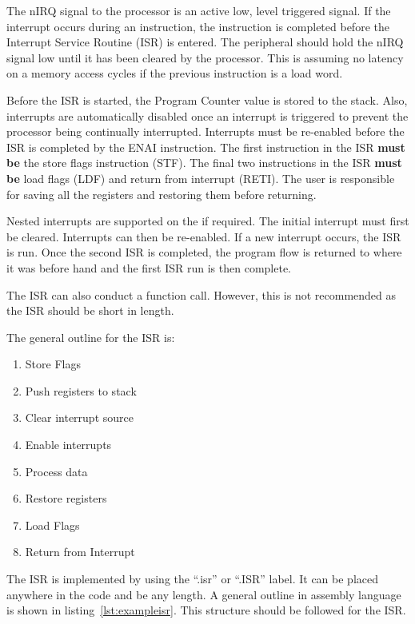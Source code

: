 The nIRQ signal to the \samurai{} processor is an active low, level triggered signal.
If the interrupt occurs during an instruction, the instruction is completed before the Interrupt Service Routine (ISR) is entered.
The peripheral should hold the nIRQ signal low until it has been cleared by the processor.
This is assuming no latency on a memory access cycles if the previous instruction is a load word. 

Before the ISR is started, the Program Counter value is stored to the stack. 
Also, interrupts are automatically disabled once an interrupt is triggered to prevent the processor being continually interrupted.
Interrupts must be re-enabled before the ISR is completed by the ENAI instruction.
The first instruction in the ISR \textbf{must be} the store flags instruction (STF). 
The final two instructions in the ISR \textbf{must be} load flags (LDF) and return from interrupt (RETI). 
The user is responsible for saving all the registers and restoring them before returning. 

Nested interrupts are supported on the \samurai{} if required. 
The initial interrupt must first be cleared. 
Interrupts can then be re-enabled. 
If a new interrupt occurs, the ISR is run. 
Once the second ISR is completed, the program flow is returned to where it was before hand and the first ISR run is then complete.

The ISR can also conduct a function call. 
However, this is not recommended as the ISR should be short in length.

The general outline for the ISR is:
\begin{enumerate}
\item Store Flags
\item Push registers to stack
\item Clear interrupt source
\item Enable interrupts
\item Process data
\item Restore registers
\item Load Flags
\item Return from Interrupt
\end{enumerate}

The ISR is implemented by using the ``.isr'' or ``.ISR'' label. 
It can be placed anywhere in the code and be any length.
A general outline in assembly language is shown in listing~\ref{lst:exampleisr}. 
This structure should be followed for the ISR.






